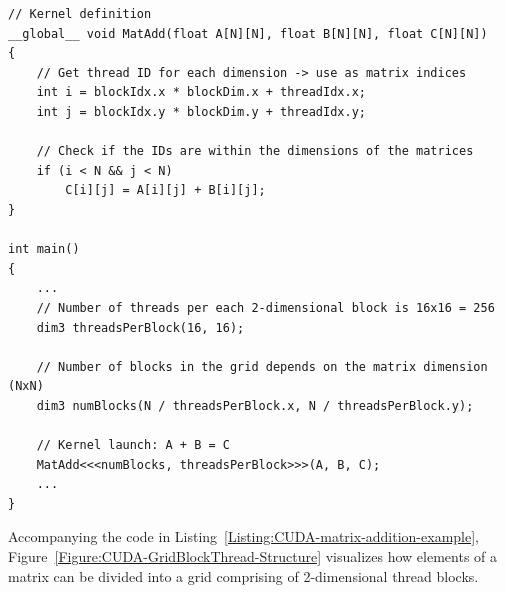 \begin{lstlisting}[caption={Example of C++ pseudocode of a kernel that adds 2 matrices using 2-dimensional thread blocks. Since each thread has a unique \code{globalID} for each of 2 dimensions, then those IDs can be used as indices for adding matrix elements. This simple example does not take into account allocation and copying data from host to device. Taken from Nvidia's \emph{CUDA C++ Programming Guide} \cite{NVIDIAMay2022}.},label={Listing:CUDA-matrix-addition-example}]
// Kernel definition
__global__ void MatAdd(float A[N][N], float B[N][N], float C[N][N])
{
	// Get thread ID for each dimension -> use as matrix indices
	int i = blockIdx.x * blockDim.x + threadIdx.x;
	int j = blockIdx.y * blockDim.y + threadIdx.y;
	
	// Check if the IDs are within the dimensions of the matrices
	if (i < N && j < N)
		C[i][j] = A[i][j] + B[i][j];
}

int main()
{
	...
	// Number of threads per each 2-dimensional block is 16x16 = 256
	dim3 threadsPerBlock(16, 16);
	
	// Number of blocks in the grid depends on the matrix dimension (NxN)
	dim3 numBlocks(N / threadsPerBlock.x, N / threadsPerBlock.y);
	
	// Kernel launch: A + B = C
	MatAdd<<<numBlocks, threadsPerBlock>>>(A, B, C);
	...
}
\end{lstlisting}

Accompanying the code in Listing~\ref{Listing:CUDA-matrix-addition-example}, Figure~\ref{Figure:CUDA-GridBlockThread-Structure} visualizes how elements of a matrix can be divided into a grid comprising of 2-dimensional thread blocks.

